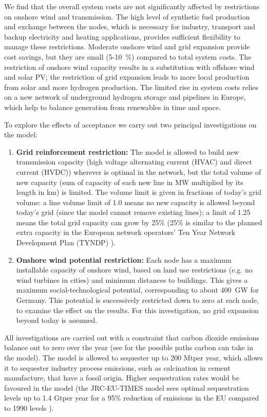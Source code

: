 We find that the overall system costs are not significantly affected
by restrictions on onshore wind and transmission. The high level of
synthetic fuel production and exchange between the nodes, which is
necessary for industry, transport and backup electricity and heating
applications, provides sufficient flexibility to manage these
restrictions. Moderate onshore wind and grid expansion provide cost
savings, but they are small (5-10~\%) compared to total system
costs. The restriction of onshore wind capacity results in a
substitution with offshore wind and solar PV; the restriction of grid
expansion leads to more local production from solar and more hydrogen
production. The limited rise in system costs relies on a new network
of underground hydrogen storage and pipelines in Europe, which help to balance
generation from renewables in time and space.

To explore the effects of acceptance we carry out two principal investigations
on the model:
\begin{enumerate}
\item {\bf Grid reinforcement restriction:} The model is allowed to build new
transmission capacity (high voltage alternating current (HVAC) and direct
current (HVDC)) wherever is optimal in the network, but the total volume of new
capacity (sum of capacity of each new line in MW multiplied by its length in km)
is limited. The volume limit is given in fractions of today's grid volume: a
line volume limit of 1.0 means no new capacity is allowed beyond today's grid
(since the model cannot remove existing lines); a limit of 1.25 means the total
grid capacity can grow by 25\% (25\% is similar to the planned extra capacity in
the European network operators' Ten Year Network Development Plan (TYNDP)
\cite{TYNDP2016}).
\item {\bf Onshore wind potential restriction:} Each node has a maximum
installable capacity of onshore wind, based on land use restrictions (e.g. no
wind turbines in cities) and minimum distances to buildings. This gives a
maximum social-technological potential, corresponding to about 400~GW for
Germany. This potential is successively restricted down to zero at each node, to
examine the effect on the results. For this investigation, no grid expansion
beyond today is assumed.
\end{enumerate}


All investigations are carried out with a constraint that carbon dioxide
emissions balance out to zero over the year (see for
the possible paths carbon can take in the model). The model is allowed to
sequester up to 200 Mt\co per year, which allows it to sequester industry
process emissions, such as calcination in cement manufacture, that have a fossil
origin. Higher sequestration rates would be favoured in the model (the
JRC-EU-TIMES model sees optimal sequestration levels up to 1.4 Gt\co per year
for a 95\% reduction of \co emissions in the EU compared to 1990 levels
\cite{blancoPotentialHydrogen2018}).

